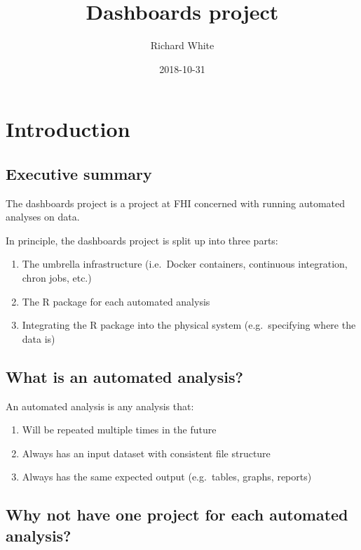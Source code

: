 \documentclass[12pt,]{article}
\title{Dashboards project}
\author{Richard White}
\date{2018-10-31}
\providecommand{\tightlist}{%
  \setlength{\itemsep}{0pt}\setlength{\parskip}{0pt}}
\begin{document}
\maketitle

{
\hypersetup{linkcolor=black}
\setcounter{tocdepth}{2}
\tableofcontents
}
\listoftables
\listoffigures
\section{Introduction}\label{introduction}

\subsection{Executive summary}\label{executive-summary}

The dashboards project is a project at FHI concerned with running
automated analyses on data.

In principle, the dashboards project is split up into three parts:

\begin{enumerate}
\def\labelenumi{\arabic{enumi}.}
\tightlist
\item
  The umbrella infrastructure (i.e.~Docker containers, continuous
  integration, chron jobs, etc.)
\item
  The R package for each automated analysis
\item
  Integrating the R package into the physical system (e.g.~specifying
  where the data is)
\end{enumerate}

\subsection{What is an automated
analysis?}\label{what-is-an-automated-analysis}

An automated analysis is any analysis that:

\begin{enumerate}
\def\labelenumi{\arabic{enumi}.}
\tightlist
\item
  Will be repeated multiple times in the future
\item
  Always has an input dataset with consistent file structure
\item
  Always has the same expected output (e.g.~tables, graphs, reports)
\end{enumerate}

\subsection{Why not have one project for each automated
analysis?}\label{why-not-have-one-project-for-each-automated-analysis}
\end{document}
